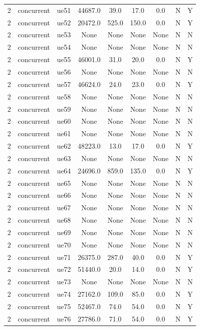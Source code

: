 \begin{table}[ht]
\begin{tabular}{|c|c|c|c|c|c|c|c|c|}
2 & concurrent & ue51 & 44687.0 & 39.0 & 17.0 & 0.0 & N & Y \\
2 & concurrent & ue52 & 20472.0 & 525.0 & 150.0 & 0.0 & N & Y \\
2 & concurrent & ue53 & None & None & None & None & N & N \\
2 & concurrent & ue54 & None & None & None & None & N & N \\
2 & concurrent & ue55 & 46001.0 & 31.0 & 20.0 & 0.0 & N & Y \\
2 & concurrent & ue56 & None & None & None & None & N & N \\
2 & concurrent & ue57 & 46624.0 & 24.0 & 23.0 & 0.0 & N & Y \\
2 & concurrent & ue58 & None & None & None & None & N & N \\
2 & concurrent & ue59 & None & None & None & None & N & N \\
2 & concurrent & ue60 & None & None & None & None & N & N \\
2 & concurrent & ue61 & None & None & None & None & N & N \\
2 & concurrent & ue62 & 48223.0 & 13.0 & 17.0 & 0.0 & N & Y \\
2 & concurrent & ue63 & None & None & None & None & N & N \\
2 & concurrent & ue64 & 24696.0 & 859.0 & 135.0 & 0.0 & N & Y \\
2 & concurrent & ue65 & None & None & None & None & N & N \\
2 & concurrent & ue66 & None & None & None & None & N & N \\
2 & concurrent & ue67 & None & None & None & None & N & N \\
2 & concurrent & ue68 & None & None & None & None & N & N \\
2 & concurrent & ue69 & None & None & None & None & N & N \\
2 & concurrent & ue70 & None & None & None & None & N & N \\
2 & concurrent & ue71 & 26375.0 & 287.0 & 40.0 & 0.0 & N & Y \\
2 & concurrent & ue72 & 51440.0 & 20.0 & 14.0 & 0.0 & N & Y \\
2 & concurrent & ue73 & None & None & None & None & N & N \\
2 & concurrent & ue74 & 27162.0 & 109.0 & 85.0 & 0.0 & N & Y \\
2 & concurrent & ue75 & 52467.0 & 74.0 & 54.0 & 0.0 & N & Y \\
2 & concurrent & ue76 & 27786.0 & 71.0 & 54.0 & 0.0 & N & Y \\

\end{tabular}
\end{table}
